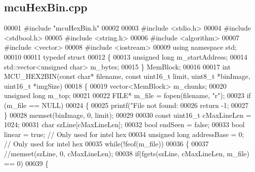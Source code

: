 \subsection{mcu\+Hex\+Bin.\+cpp}
\label{mcuHexBin_8cpp_source}

\begin{DoxyCode}
00001 \textcolor{preprocessor}{#include "mcuHexBin.h"}
00002 
00003 \textcolor{preprocessor}{#include <stdio.h>}
00004 \textcolor{preprocessor}{#include <stdbool.h>}
00005 \textcolor{preprocessor}{#include <string.h>}
00006 \textcolor{preprocessor}{#include <algorithm>}
00007 \textcolor{preprocessor}{#include <vector>}
00008 \textcolor{preprocessor}{#include <iostream>}
00009 \textcolor{keyword}{using namespace }std;
00010 
00011 \textcolor{keyword}{typedef} \textcolor{keyword}{struct}
00012 \{
00013     \textcolor{keywordtype}{unsigned} \textcolor{keywordtype}{long} m\_startAddress;
00014     std::vector<unsigned char> m_bytes;
00015 \} MemBlock;
00016 
00017 \textcolor{keywordtype}{int} MCU_HEX2BIN(\textcolor{keyword}{const} \textcolor{keywordtype}{char}* filename, \textcolor{keyword}{const} uint16\_t limit, uint8\_t *binImage, uint16\_t *imgSize)
00018 \{
00019     vector<MemBlock>    m\_chunks;
00020     \textcolor{keywordtype}{unsigned} \textcolor{keywordtype}{long}       m\_top;
00021 
00022     FILE* m\_file = fopen(filename, \textcolor{stringliteral}{"r"});
00023     \textcolor{keywordflow}{if} (m\_file == NULL)
00024     \{
00025         printf(\textcolor{stringliteral}{"File not found: %
00026         \textcolor{keywordflow}{return} -1;
00027     \}
00028     memset(binImage, 0, limit);
00029 
00030     \textcolor{keyword}{const} uint16\_t cMaxLineLen = 1024;
00031     \textcolor{keywordtype}{char} szLine[cMaxLineLen];
00032     \textcolor{keywordtype}{bool} endSeen = \textcolor{keyword}{false};
00033     \textcolor{keywordtype}{bool} linear = \textcolor{keyword}{true};             \textcolor{comment}{// Only used for intel hex}
00034     \textcolor{keywordtype}{unsigned} \textcolor{keywordtype}{long} addressBase = 0;  \textcolor{comment}{// Only used for intel hex}
00035     \textcolor{keywordflow}{while}(!feof(m\_file))
00036     \{
00037         \textcolor{comment}{//memset(szLine, 0, cMaxLineLen);}
00038         \textcolor{keywordflow}{if}(fgets(szLine, cMaxLineLen, m\_file) == 0)
00039         \{
}
\end{DoxyCode}
